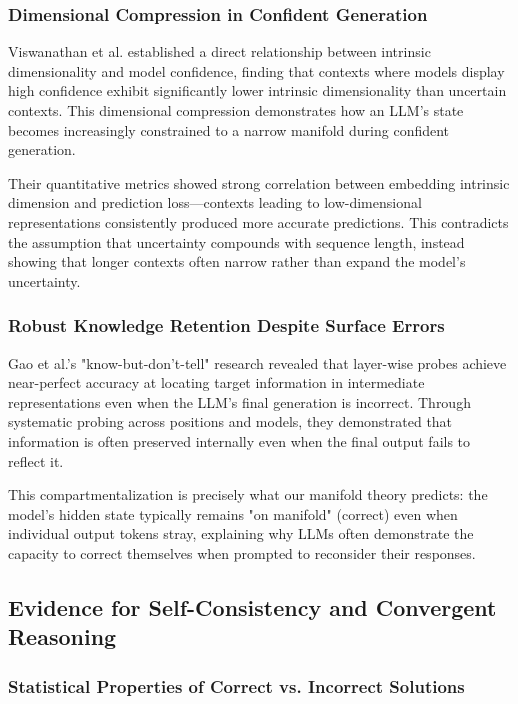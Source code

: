 \documentclass{article}
\begin{document}
\subsubsection{Dimensional Compression in Confident Generation}

Viswanathan et al. \citep{viswanathan2024geometry} established a direct relationship between intrinsic dimensionality and model confidence, finding that contexts where models display high confidence exhibit significantly lower intrinsic dimensionality than uncertain contexts. This dimensional compression demonstrates how an LLM's state becomes increasingly constrained to a narrow manifold during confident generation.

Their quantitative metrics showed strong correlation between embedding intrinsic dimension and prediction loss—contexts leading to low-dimensional representations consistently produced more accurate predictions. This contradicts the assumption that uncertainty compounds with sequence length, instead showing that longer contexts often narrow rather than expand the model's uncertainty.

\subsubsection{Robust Knowledge Retention Despite Surface Errors}

Gao et al.'s \citep{gao2024insights} "know-but-don't-tell" research revealed that layer-wise probes achieve near-perfect accuracy at locating target information in intermediate representations even when the LLM's final generation is incorrect. Through systematic probing across positions and models, they demonstrated that information is often preserved internally even when the final output fails to reflect it.

This compartmentalization is precisely what our manifold theory predicts: the model's hidden state typically remains "on manifold" (correct) even when individual output tokens stray, explaining why LLMs often demonstrate the capacity to correct themselves when prompted to reconsider their responses.

\subsection{Evidence for Self-Consistency and Convergent Reasoning}

\subsubsection{Statistical Properties of Correct vs. Incorrect Solutions}
\end{document}
